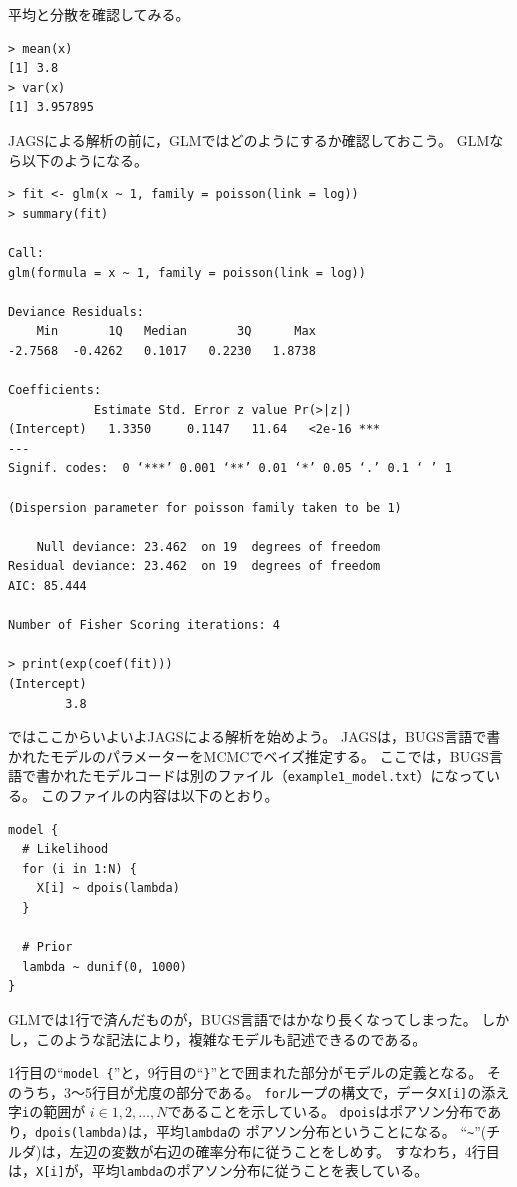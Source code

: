 \documentclass[11pt,uplatex]{jsarticle}
\begin{document}
平均と分散を確認してみる。
\begin{lstlisting}
> mean(x)
[1] 3.8
> var(x)
[1] 3.957895
\end{lstlisting}

\textsf{JAGS}による解析の前に，GLMではどのようにするか確認しておこう。
GLMなら以下のようになる。
\begin{lstlisting}
> fit <- glm(x ~ 1, family = poisson(link = log))
> summary(fit)

Call:
glm(formula = x ~ 1, family = poisson(link = log))

Deviance Residuals: 
    Min       1Q   Median       3Q      Max  
-2.7568  -0.4262   0.1017   0.2230   1.8738  

Coefficients:
            Estimate Std. Error z value Pr(>|z|)    
(Intercept)   1.3350     0.1147   11.64   <2e-16 ***
---
Signif. codes:  0 ‘***’ 0.001 ‘**’ 0.01 ‘*’ 0.05 ‘.’ 0.1 ‘ ’ 1

(Dispersion parameter for poisson family taken to be 1)

    Null deviance: 23.462  on 19  degrees of freedom
Residual deviance: 23.462  on 19  degrees of freedom
AIC: 85.444

Number of Fisher Scoring iterations: 4

> print(exp(coef(fit)))
(Intercept) 
        3.8 
\end{lstlisting}

\vspace{1zw}

ではここからいよいよ\textsf{JAGS}による解析を始めよう。
\textsf{JAGS}は，\textsf{BUGS}言語で書かれたモデルのパラメーターをMCMCでベイズ推定する。
ここでは，\textsf{BUGS}言語で書かれたモデルコードは別のファイル（\texttt{example1\_model.txt}）になっている。
このファイルの内容は以下のとおり。
\begin{lstlisting}
model {
  # Likelihood
  for (i in 1:N) {
    X[i] ~ dpois(lambda)
  }

  # Prior
  lambda ~ dunif(0, 1000)
}
\end{lstlisting}
%
GLMでは1行で済んだものが，\textsf{BUGS言語}ではかなり長くなってしまった。
しかし，このような記法により，複雑なモデルも記述できるのである。

1行目の``\texttt{model \{}''と，9行目の``\texttt{\}}''とで囲まれた部分がモデルの定義となる。
そのうち，3〜5行目が尤度の部分である。
\texttt{for}ループの構文で，データ\texttt{X[i]}の添え字\texttt{i}の範囲が
$i \in 1, 2, \dots, N$であることを示している。
\texttt{dpois}はポアソン分布であり，\texttt{dpois(lambda)}は，平均\texttt{lambda}の
ポアソン分布ということになる。
``\texttt{\textasciitilde}''(チルダ)は，左辺の変数が右辺の確率分布に従うことをしめす。
すなわち，4行目は，\texttt{X[i]}が，平均\texttt{lambda}のポアソン分布に従うことを表している。
\end{document}
